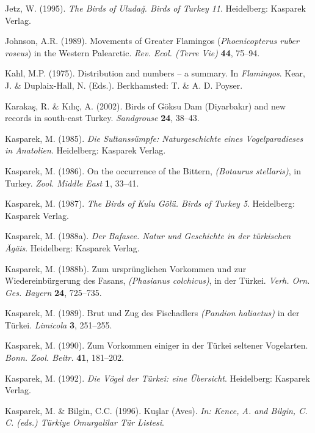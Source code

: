 \documentclass[
  a4paper,
  DIV=11,
  numbers=noendperiod]{scrreprt}
\newlength{\cslhangindent}
\newenvironment{CSLReferences}[2] %
 {\begin{list}{}{%
  \setlength{\itemindent}{0pt}
  \setlength{\leftmargin}{0pt}
  \setlength{\parsep}{0pt}
  \ifodd #1
   \setlength{\leftmargin}{\cslhangindent}
   \setlength{\itemindent}{-1\cslhangindent}
  \fi
  \setlength{\itemsep}{#2\baselineskip}}}
 {\end{list}}
\begin{document}
\begin{CSLReferences}{1}{1}
Jetz, W. (1995). \emph{{The Birds of Uludağ. Birds of Turkey 11}}.
Heidelberg: Kasparek Verlag.

Johnson, A.R. (1989). {Movements of Greater Flamingos
(\emph{Phoenicopterus ruber roseus}) in the Western Palearctic}.
\emph{Rev. Ecol. (Terre Vie)} \textbf{44}, 75--94.

Kahl, M.P. (1975). {Distribution and numbers -- a summary}. In
\emph{Flamingos}. Kear, J. \& Duplaix-Hall, N. (Eds.). Berkhamsted: T.
\& A. D. Poyser.

Karakaş, R. \& Kılıç, A. (2002). {Birds of Göksu Dam (Diyarbakır) and
new records in south-east Turkey}. \emph{Sandgrouse} \textbf{24},
38--43.

Kasparek, M. (1985). \emph{{Die Sultanssümpfe: Naturgeschichte eines
Vogelparadieses in Anatolien}}. Heidelberg: Kasparek Verlag.

Kasparek, M. (1986). {On the occurrence of the Bittern, \emph{(Botaurus
stellaris)}, in Turkey}. \emph{Zool. Middle East} \textbf{1}, 33--41.

Kasparek, M. (1987). \emph{{The Birds of Kulu Gölü. Birds of Turkey 5}}.
Heidelberg: Kasparek Verlag.

Kasparek, M. (1988a). \emph{{Der Bafasee. Natur und Geschichte in der
türkischen Ägäis}}. Heidelberg: Kasparek Verlag.

Kasparek, M. (1988b). {Zum ursprünglichen Vorkommen und zur
Wiedereinbürgerung des Fasans, \emph{(Phasianus colchicus)}, in der
Türkei}. \emph{Verh. Orn. Ges. Bayern} \textbf{24}, 725--735.

Kasparek, M. (1989). {Brut und Zug des Fischadlers \emph{(Pandion
haliaetus)} in der Türkei}. \emph{Limicola} \textbf{3}, 251--255.

Kasparek, M. (1990). {Zum Vorkommen einiger in der Türkei seltener
Vogelarten}. \emph{Bonn. Zool. Beitr.} \textbf{41}, 181--202.

Kasparek, M. (1992). \emph{{Die Vögel der Türkei: eine Übersicht}}.
Heidelberg: Kasparek Verlag.

Kasparek, M. \& Bilgin, C.C. (1996). {Kuşlar (Aves)}. \emph{In: Kence,
A. and Bilgin, C. C. (eds.) Türkiye Omurgalilar Tür Listesi}.


\end{CSLReferences}
\end{document}
